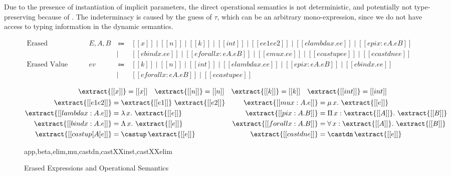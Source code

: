 Due to the presence of instantiation of implicit parameters, the direct operational
semantics is not deterministic, and potentially not type-preserving because of
. The indeterminacy is caused by the guess of $\tau$,
which can be an arbitrary mono-expression, since we do not have access to typing
information in the dynamic semantics.

\begin{figure}
  \centering
  \begin{equation*}
  \begin{array}{llcl}
      \text{Erased Expressions} & E, A, B & ~ \Coloneqq ~ & [[x]] \mid [[n]] \mid [[k]] \mid [[int]] \mid [[ee1 ee2]] \mid [[elambda x. ee]] \mid [[epi x : eA. eB]] \\
      & & \mid & [[ebind x. ee]] \mid [[eforall x : eA. eB]] \mid [[emu x. ee]] \mid [[ecastup ee]] \mid [[ecastdn ee]] \\
      \text{Erased Value} & ev & ~ \Coloneqq ~ & [[k]] \mid [[n]] \mid [[int]] \mid [[elambda x. ee]] \mid [[epi x : eA. eB]] \mid [[ebind x. ee]] \\
      & & \mid & [[eforall x : eA. eB]] \mid [[ecastup ee]]
  \end{array}
  \end{equation*}

  \begin{gather*}
    \begin{align*}
    \extract{[[x]]} &= [[x]] &
    \extract{[[n]]} &= [[n]] &
    \extract{[[k]]} &= [[k]] &
    \extract{[[int]]} &= [[int]]
    \end{align*} \\
    \begin{align*}
     \extract{[[e1 e2]]} &= \extract{[[e1]]} ~ \extract{[[e2]]} & %
      \extract{[[mu x : A. e]]} &= \mu \, x. ~ \extract{[[e]]} \\
     \extract{[[lambda x : A. e]]} &= \lambda \, x. ~ \extract{[[e]]} & %
      \extract{[[pi x : A. B]]} &= \Pi \, x : \extract{[[A]]}. ~ \extract{[[B]]} \\
     \extract{[[bind x : A. e]]} &= \Lambda \, x. ~ \extract{[[e]]} & %
      \extract{[[forall x : A. B]]} &= \forall \, x : \extract{[[A]]}. ~ \extract{[[B]]} \\
     \extract{[[castup [A] e]]} &= \castup \, \extract{[[e]]} & %
      \extract{[[castdn e]]} &= \castdn \, \extract{[[e]]}
    \end{align*}
  \end{gather*}

    {app,beta,elim,mu,castdn,castXXinst,castXXelim}
  \caption{Erased Expressions and Operational Semantics}
  \label{fig:extraction}
\end{figure}

